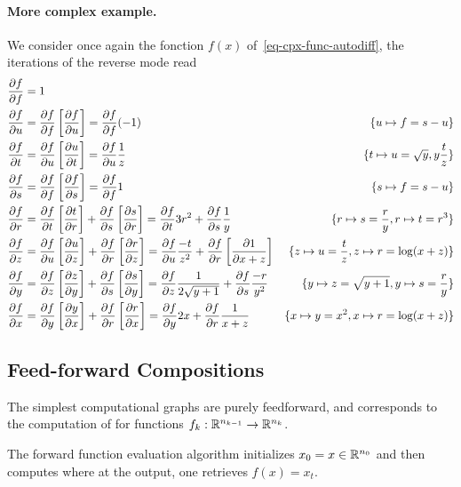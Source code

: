 \paragraph{More complex example.}

We consider once again the fonction $f(x)$ of~\eqref{eq-cpx-func-autodiff}, the iterations of the reverse mode read
\begin{align*}
		\pd{f}{f} &= 1 &\\
		\pd{f}{u} &= \pd{f}{f} \pdb{f}{u} 
			= \pd{f}{f} (-1) &
			\{u \mapsto f = s-u\}\\
		\pd{f}{t} &= \pd{f}{u} \pdb{u}{t} 
			= \pd{f}{u} \frac{1}{z}  & 
			\{ t \mapsto u= \sqrt{y}, y \frac{t}{z} \} \\
		\pd{f}{s} &= \pd{f}{f} \pdb{f}{s} = \pd{f}{f} 1 & 
			\{ s \mapsto f = s-u \} \\
		\pd{f}{r} &= \pd{f}{t} \pdb{t}{r} + \pd{f}{s} \pdb{s}{r} 
			= \pd{f}{t} 3r^2 + \pd{f}{s} \frac{1}{y} & 
			\{ r \mapsto s = \frac{r}{y}, r \mapsto  t=r^3\}  \\
		\pd{f}{z} &= \pd{f}{u} \pdb{u}{z} + \pd{f}{r} \pdb{r}{z} 
			= \pd{f}{u} \frac{-t}{z^2} + \pd{f}{r} \pdb{1}{x+z} &
			\{ z \mapsto u=\frac{t}{z}, z \mapsto r=\log(x+z)\} \\
		\pd{f}{y} &= \pd{f}{z}\pdb{z}{y} + \pd{f}{s}\pdb{s}{y}
			= \pd{f}{z} \frac{1}{2\sqrt{y+1}} + \pd{f}{s}\frac{-r}{y^2} &
			\{ y \mapsto z=\sqrt{y+1}, y \mapsto s = \frac{r}{y}\} \\
		\pd{f}{x} &= \pd{f}{y}\pdb{y}{x} + \pd{f}{r}\pdb{r}{x}
			= \pd{f}{y} 2x + \pd{f}{r} \frac{1}{x+z}  &
			\{x \mapsto y=x^2, x \mapsto r=\log(x+z)\}		
\end{align*}
\fi


\subsection{Feed-forward Compositions}

The simplest computational graphs are purely feedforward, and corresponds to the computation of 
for functions $f_k : \RR^{n_{k-1}} \rightarrow \RR^{n_{k}}$.

The forward function evaluation algorithm initializes $x_0=x \in \RR^{n_0}$ and then computes
where at the output, one retrieves $f(x) = x_t$.

